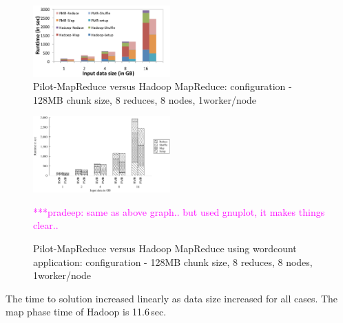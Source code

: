 \documentclass{acm_proc_article-sp}
\newcommand{\pnote}[1]{ {\textcolor{magenta} { ***pradeep: #1 }}}
\newcommand{\pnote}[1]{}
\begin{document}
\begin{figure}[compPMRvsHMR]
	\centering
		\includegraphics[width=0.47\textwidth]{figures/wc_hadoopvspmr_stackcluster.pdf}
		\caption{Pilot-MapReduce versus Hadoop MapReduce: configuration - 128MB chunk size, 8 reduces, 8 nodes, 1worker/node} 
	\label{fig:figures_compPMRvsHMR}
\end{figure}	

\begin{figure}[compPMRvsHMR_gnuplot]
	\centering
		\includegraphics[width=0.47\textwidth]{figures/wordcount_hmr_pmr.pdf}
		\caption{Pilot-MapReduce versus Hadoop MapReduce using wordcount application: configuration - 128MB chunk size, 8 reduces, 8 nodes, 1worker/node} 
		\pnote{same as above graph.. but used gnuplot, it makes things clear..}
	\label{fig:figures_compPMRvsHMR_gnuplot}
\end{figure}		
	


The time to solution increased linearly as data size increased for all cases. 
The map phase time of Hadoop is 11.6\,sec.

\end{document}
